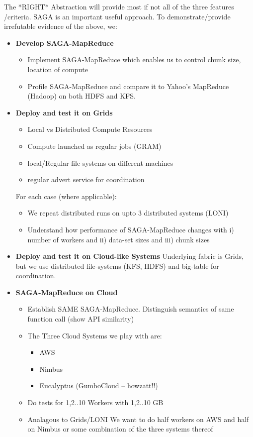 \documentclass[conference,final]{IEEEtran}
\begin{document}
The *RIGHT* Abstraction will provide most if not all of the three
features /criteria. SAGA is an important useful approach.  To
demonstrate/provide irrefutable evidence of the above, we:

\begin{itemize}
\item {\bf Develop SAGA-MapReduce }

  \begin{itemize}
  \item Implement SAGA-MapReduce which enables us to control chunk
    size, location of compute
  \item Profile SAGA-MapReduce and compare it to Yahoo's MapReduce
    (Hadoop) on both HDFS and KFS.
  \end{itemize}

\item {\bf Deploy and test it on Grids}
  \begin{itemize}
  \item Local vs Distributed Compute Resources
  \item Compute launched as regular jobs (GRAM)
  \item local/Regular file systems on different machines
  \item regular advert service for coordination
  \end{itemize}

For each case (where applicable):
  \begin{itemize}
  \item We repeat distributed runs on upto 3 distributed systems
    (LONI)
  \item Understand how performance of SAGA-MapReduce changes with i)
    number of workers and ii) data-set sizes and iii) chunk sizes
  \end{itemize}

\item {\bf Deploy and test it on Cloud-like Systems} Underlying fabric
  is Grids, but we use distributed file-systems (KFS, HDFS) and
  big-table for coordination.
\item {\bf SAGA-MapReduce on Cloud}
  \begin{itemize}
  \item Establish SAME SAGA-MapReduce. Distinguish semantics of same
    function call (show API similarity)
  \item The Three Cloud Systems we play with are:
    \begin{itemize}
    \item AWS
    \item Nimbus
    \item Eucalyptus (GumboCloud -- howzatt!!)
    \end{itemize}
  \item Do tests for 1,2..10 Workers with 1,2..10 GB
  \item Analagous to Grids/LONI We want to do half workers on AWS and
    half on Nimbus or some combination of the three systems thereof
  \end{itemize}
\end{itemize}
\end{document}
